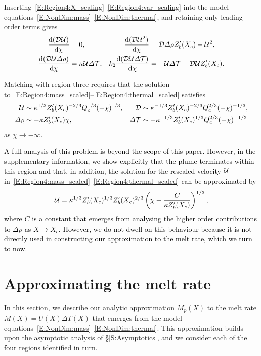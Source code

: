\documentclass[openacc]{rsproca_new}%
\newcommand{\dd}[2]{\frac{\mathrm{d} #1}{\mathrm{d} #2}}
\newcommand{\blue}[1]{{\color{blue} #1}}
\renewcommand{\blue}[1]{{\textcolor{black}{#1}}} %
\begin{document}
Inserting~\eqref{E:Region4:X_scaling}--\eqref{E:Region4:var_scaling} into the model equations~\eqref{E:NonDim:mass}--\eqref{E:NonDim:thermal}, and retaining only leading order terms gives
\begin{align}
\dd{(\D\U)}{\chi} &=0, &
\dd{(\D \U^2)}{\chi} &=  \D \p Z_b'(X_c) -\U^2,\label{E:Region4:mass_scaled}\\
\dd{(\D\U\p)}{\chi} &=\kappa  \U\t, &
k_2 \dd{(\D \U \t)}{\chi} &=- \U \t - \D \U Z_b'(X_c).\label{E:Region4:thermal_scaled}
\end{align}


Matching with region three requires that the solution to~\eqref{E:Region4:mass_scaled}--\eqref{E:Region4:thermal_scaled} satisfies
\begin{align}
\mathcal{U} &\sim \kappa^{1/3}Z_b'(X_c)^{-2/3}Q_c^{1/3} (-\chi)^{1/3}, &  \mathcal{D} &\sim \kappa^{-1/3} Z_b'(X_c)^{-2/3} Q_c^{2/3}(-\chi)^{-1/3}\label{E:Region4:far_field1},\\
\varDelta \varrho &\sim - \kappa Z_b'(X_c) \chi, & \varDelta \mathcal{T} &\sim -\kappa^{-1/3} Z_b'(X_c)^{1/3} Q_c^{2/3}(-\chi)^{-1/3}\label{E:Region4:far_field2}
\end{align}
as $\chi \to -\infty$. 

\blue{A full analysis of this problem is beyond the scope of this paper. However, in the supplementary information, we show explicitly that the plume terminates within this region and that, in addition, the solution for the rescaled velocity $\mathcal{U}$ in~\eqref{E:Region4:mass_scaled}--\eqref{E:Region4:thermal_scaled} can be approximated by} 
\begin{equation}
     \mathcal{U} =  \kappa^{1/3}Z_b'(X_c)^{1/3}Z_b'(X_c)^{2/3} \left(\chi - \frac{C}{\kappa Z_b'(X_c)}\right)^{1/3},
\end{equation}
\blue{where $C$ is a constant that emerges from analysing the higher order contributions to $\Delta \rho$ as $X \to X_c$. However, we do not dwell on this behaviour because it is not directly used in constructing our approximation to the melt rate, which we turn to now.}

\section{Approximating the melt rate}\label{S:MeltRate}
In this section, we describe our analytic approximation $M_p(X)$ to the melt rate $M(X) = U(X)\Delta T(X)$ that emerges from the model equations~\eqref{E:NonDim:mass}--\eqref{E:NonDim:thermal}. This approximation builds upon the asymptotic analysis of \S\ref{S:Asymptotics}, and we consider each of the four regions identified in turn. 
\end{document}
